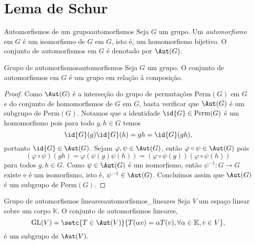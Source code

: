 \section{Lema de Schur}
\begin{definition}{Automorfismos de um grupo}{automorfismos}
    Seja \(G\) um grupo. Um \emph{automorfismo} em \(G\) é um isomorfismo de \(G\) em \(G\), isto é, um homomorfismo bijetivo. O conjunto de automorfismos em \(G\) é denotado por \(\Aut(G)\).
\end{definition}
\begin{proposition}{Grupo de automorfismos}{automorfismos}
    Seja \(G\) um grupo. O conjunto de automorfismos em \(G\) é um grupo em relação à composição.
\end{proposition}
\begin{proof}
    Como \(\Aut(G)\) é a interseção do grupo de permutações \(\mathrm{Perm}(G)\) em \(G\) e do conjunto de homomorfismos de \(G\) em \(G\), basta verificar que \(\Aut(G)\) é um subgrupo de \(\mathrm{Perm}(G)\). Notamos que a identidade \(\id{G} \in \mathrm{Perm}(G)\) é um homomorfismo pois para todo \(g, h \in G\) temos
    \begin{equation*}
        \id{G}(g) \id{G}(h) = gh = \id{G}(gh),
    \end{equation*}
    portanto \(\id{G} \in \Aut(G)\). Sejam \(\varphi, \psi \in \Aut(G)\), então \(\varphi \circ \psi \in \Aut(G)\) pois
    \begin{equation*}
        (\varphi \circ \psi)(gh) = \varphi\left(\psi(g)\psi(h)\right) = \left(\varphi\circ\psi(g)\right)\left(\varphi\circ\psi(h)\right)
    \end{equation*}
    para todos \(g,h \in G\). Como \(\psi \in \Aut(G)\) é um isomorfismo, então \(\psi^{-1} : G \to G\) existe e é um isomorfismo, isto é, \(\psi^{-1} \in \Aut(G)\). Concluímos assim que \(\Aut(G)\) é um subgrupo de \(\mathrm{Perm}(G)\).
\end{proof}
\begin{proposition}{Grupo de automorfismos lineares}{automorfismos_lineares}
    Seja \(V\) um espaço linear sobre um corpo \(\mathbb{K}\). O conjunto de automorfismos lineares,
    \begin{equation*}
        \mathrm{GL}(V) = \setc{T \in \Aut(V)}{T(\alpha v) = \alpha T(v), \forall \alpha \in \mathbb{K}, v \in V},
    \end{equation*}
    é um subgrupo de \(\Aut(V)\).
\end{proposition}
